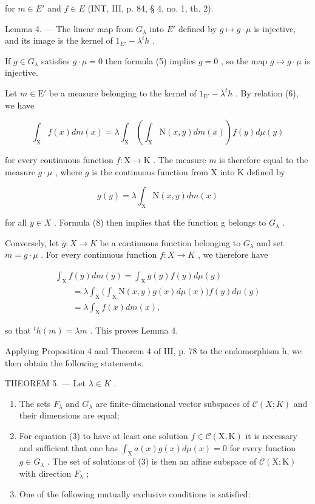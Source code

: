 for \(m \in E'\) and \(f \in E\) (INT, III, p. 84, § 4, no. 1, th. 2).

Lemma 4. --- The linear map from \(G_{\lambda}\) into \(E'\) defined by \(g \mapsto g \cdot \mu\) is injective, and its image is the kernel of \(1_{E'} - \lambda^{t}h\) .

If \(g \in G_{\lambda}\) satisfies \(g \cdot \mu = 0\) then formula (5) implies \(g = 0\) , so the map \(g \mapsto g \cdot \mu\) is injective.

Let \(m \in \mathrm{E}'\) be a measure belonging to the kernel of \(1_{\mathrm{E}'} - \lambda^t h\) . By relation (6), we have

\[
\int_ {\mathrm{X}} f (x) d m (x) = \lambda \int_ {\mathrm{X}} \left(\int_ {\mathrm{X}} \mathrm{N} (x, y) d m (x)\right) f (y) d \mu (y)\tag{7}
\]

for every continuous function \(f: \mathrm{X} \to \mathrm{K}\) . The measure \(m\) is therefore equal to the measure \(g \cdot \mu\) , where \(g\) is the continuous function from \(\mathrm{X}\) into \(\mathrm{K}\) defined by

\[
g (y) = \lambda \int_ {\mathrm{X}} \mathrm{N} (x, y) d m (x)\tag{8}
\]

for all \(y \in X\) . Formula (8) then implies that the function g belongs to \(G_{\lambda}\) .

Conversely, let \(g: X \to K\) be a continuous function belonging to \(G_{\lambda}\) and set \(m = g \cdot \mu\) . For every continuous function \(f: X \to K\) , we therefore have

\[
\begin{array}{l} \int_ {\mathrm{X}} f (y) d m (y) = \int_ {\mathrm{X}} g (y) f (y) d \mu (y) \\ \qquad = \lambda \int_ {\mathrm{X}} \Big (\int_ {\mathrm{X}} \mathrm{N} (x, y) g (x) d \mu (x) \Big) f (y) d \mu (y) \\ \qquad = \lambda \int_ {\mathrm{X}} f (x) d m (x), \end{array}
\]

so that \({}^{t}h(m)=\lambda m\) . This proves Lemma 4.

Applying Proposition 4 and Theorem 4 of III, p. 78 to the endomorphism h, we then obtain the following statements.

THEOREM 5. --- Let \(\lambda\in K\) .

\begin{enumerate}
\def\labelenumi{\alph{enumi})}
\item
  The sets \(F_{\lambda}\) and \(G_{\lambda}\) are finite-dimensional vector subspaces of \(\mathcal{C}(X;K)\) and their dimensions are equal;
\item
  For equation (3) to have at least one solution \(f \in \mathcal{C}(\mathrm{X}, \mathrm{K})\) it is necessary and sufficient that one has \(\int_{\mathrm{X}} a(x) g(x) d\mu(x) = 0\) for every function \(g \in G_{\lambda}\) . The set of solutions of (3) is then an affine subspace of \(\mathcal{C}(\mathrm{X}; \mathrm{K})\) with direction \(F_{\lambda}\) ;
\item
  One of the following mutually exclusive conditions is satisfied:
\end{enumerate}

